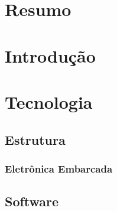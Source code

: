 \chapter{Resumo} %




\chapter{Introdução} %


\chapter{Tecnologia}

\section{Estrutura} %


\subsection{Eletrônica Embarcada} %


\section{Software} %

